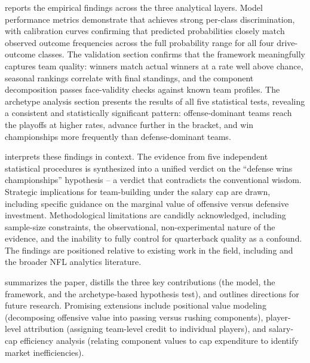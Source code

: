  reports the empirical findings across the three analytical layers. Model performance metrics demonstrate that \xscore{} achieves strong per-class discrimination, with calibration curves confirming that predicted probabilities closely match observed outcome frequencies across the full probability range for all four drive-outcome classes. The \gds{} validation section confirms that the framework meaningfully captures team quality: \gds{} winners match actual winners at a rate well above chance, seasonal \gds{} rankings correlate with final standings, and the component decomposition passes face-validity checks against known team profiles. The archetype analysis section presents the results of all five statistical tests, revealing a consistent and statistically significant pattern: offense-dominant teams reach the playoffs at higher rates, advance further in the bracket, and win championships more frequently than defense-dominant teams.

 interprets these findings in context. The evidence from five independent statistical procedures is synthesized into a unified verdict on the ``defense wins championships'' hypothesis  -- a verdict that contradicts the conventional wisdom. Strategic implications for team-building under the salary cap are drawn, including specific guidance on the marginal value of offensive versus defensive investment. Methodological limitations are candidly acknowledged, including sample-size constraints, the observational, non-experimental nature of the evidence, and the inability to fully control for quarterback quality as a confound. The findings are positioned relative to existing work in the field, including \textcite{robst2011defense} and the broader NFL analytics literature.

 summarizes the paper, distills the three key contributions (the \xscore{} model, the \gds{} framework, and the archetype-based hypothesis test), and outlines directions for future research. Promising extensions include positional value modeling (decomposing offensive value into passing versus rushing components), player-level \xvoa{} attribution (assigning team-level credit to individual players), and salary-cap efficiency analysis (relating \gds{} component values to cap expenditure to identify market inefficiencies).

